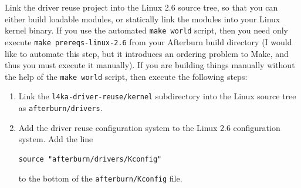 \documentclass[10pt,a4paper]{article}
\newcommand{\cmd}[1]{\texttt{#1}}
\newcommand{\dir}[1]{\texttt{#1}}
\begin{document}
Link the driver reuse project into the Linux 2.6 source
tree, so that you can either build loadable modules, or statically link
the modules into your Linux kernel binary.  If you use the automated \cmd{make
world} script, then you need only execute \cmd{make prereqs-linux-2.6}
from your Afterburn build directory (I would like to automate this step, but it
introduces an ordering problem to Make, and thus you must execute it
manually).  If you are building things manually without the help of
the \cmd{make world} script, then execute the following steps:
\begin{enumerate}
\item Link the \dir{l4ka-driver-reuse/kernel} subdirectory into
the Linux source tree as \dir{afterburn/drivers}.
\item Add the driver reuse configuration system to the Linux 2.6
configuration system.  Add the line 
\begin{verbatim}source "afterburn/drivers/Kconfig"\end{verbatim}
to the bottom of the \dir{afterburn/Kconfig} file.
\end{enumerate}
\end{document}

